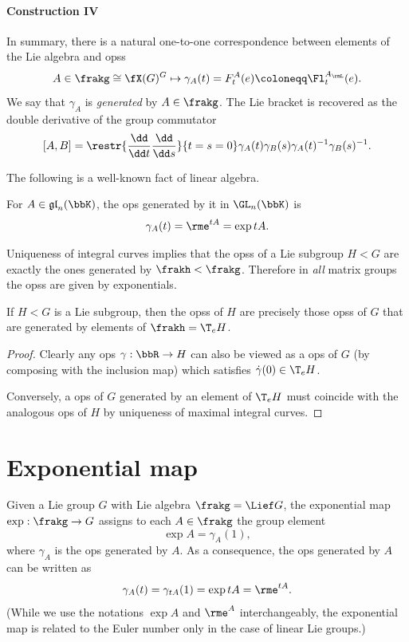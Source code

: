 \paragraph{Construction IV} In summary, there is a natural one-to-one correspondence between elements of the Lie algebra and \glspl{ops}
\[A\in \frakg\cong \fX(G)^G\mapsto \gamma_A(t)=F^A_t(e)\coloneqq \Fl^{A_\rmL}_t(e).\]
We say that $\gamma_A$ is \emph{generated} by $A\in\frakg$. The Lie bracket is recovered as the double derivative of the group commutator
\[[A,B]=\restr{\frac{\dd}{\dd t}\frac{\dd}{\dd s}}{t=s=0}\gamma_A(t)\gamma_B(s)\gamma_A(t)^{-1}\gamma_B(s)^{-1}.\]

The following is a well-known fact of linear algebra.

\begin{prop}
    For $A\in \mathfrak{gl}_n(\bbK)$, the \gls{ops} generated by it in $\GL_n(\bbK)$ is
    \[\gamma_A(t)=\rme^{tA}=\exp tA.\]
\end{prop}
\begin{cor}
    Uniqueness of integral curves implies that the \glspl{ops} of a Lie subgroup $H< G$ are exactly the ones generated by $\frakh < \frakg$. Therefore in \emph{all} matrix groups the \glspl{ops} are given by exponentials.
\end{cor}

\begin{prop}\label{prop 20.3 Lee}
    If $H< G$ is a Lie subgroup, then the \glspl{ops} of $H$ are precisely those \glspl{ops} of $G$ that are generated by elements of $\frakh=\T_e H$.
\end{prop}
\begin{proof}
    Clearly any \gls{ops} $\gamma:\bbR\to H$ can also be viewed as a \gls{ops} of $G$ (by composing with the inclusion map) which satisfies $\dot\gamma(0)\in \T_e H$.

    Conversely, a \gls{ops} of $G$ generated by an element of $\T_e H$ must coincide with the analogous \gls{ops} of $H$ by uniqueness of maximal integral curves.
\end{proof}







\section{Exponential map}


\begin{defn}
    Given a Lie group $G$ with Lie algebra $\frakg=\Lief G$, the exponential map $\exp:\frakg\to G$ assigns to each $A\in \frakg$ the group element
    \[\exp A=\gamma_A(1),\]
    where $\gamma_A$ is the \gls{ops} generated by $A$. As a consequence, the \gls{ops} generated by $A$ can be written as \[\gamma_A(t)=\gamma_{tA}(1)=\exp tA=\rme^{tA}.\]
    (While we use the notations $\exp A$ and $\rme^A$ interchangeably, the exponential map is related to the Euler number only in the case of linear Lie groups.)
\end{defn}

